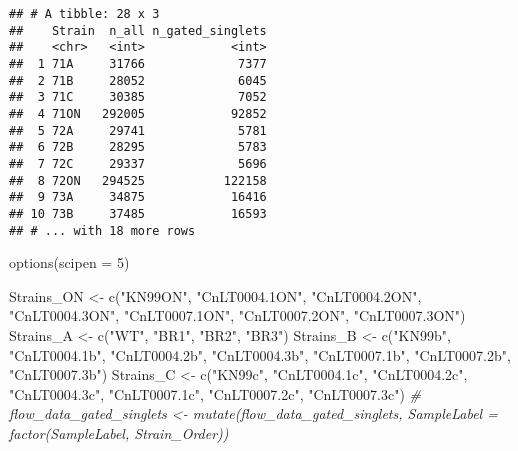 \documentclass[
]{article}
\newenvironment{Shaded}{\begin{snugshade}}{\end{snugshade}}
\newcommand{\AttributeTok}[1]{\textcolor[rgb]{0.77,0.63,0.00}{#1}}
\newcommand{\CommentTok}[1]{\textcolor[rgb]{0.56,0.35,0.01}{\textit{#1}}}
\newcommand{\DecValTok}[1]{\textcolor[rgb]{0.00,0.00,0.81}{#1}}
\newcommand{\FunctionTok}[1]{\textcolor[rgb]{0.00,0.00,0.00}{#1}}
\newcommand{\NormalTok}[1]{#1}
\newcommand{\OtherTok}[1]{\textcolor[rgb]{0.56,0.35,0.01}{#1}}
\newcommand{\StringTok}[1]{\textcolor[rgb]{0.31,0.60,0.02}{#1}}
\begin{document}
\begin{verbatim}
## # A tibble: 28 x 3
##    Strain  n_all n_gated_singlets
##    <chr>   <int>            <int>
##  1 71A     31766             7377
##  2 71B     28052             6045
##  3 71C     30385             7052
##  4 71ON   292005            92852
##  5 72A     29741             5781
##  6 72B     28295             5783
##  7 72C     29337             5696
##  8 72ON   294525           122158
##  9 73A     34875            16416
## 10 73B     37485            16593
## # ... with 18 more rows
\end{verbatim}

\begin{Shaded}
\begin{Highlighting}[]
\FunctionTok{options}\NormalTok{(}\AttributeTok{scipen =} \DecValTok{5}\NormalTok{)}

\NormalTok{Strains\_ON }\OtherTok{\textless{}{-}} \FunctionTok{c}\NormalTok{(}\StringTok{"KN99ON"}\NormalTok{, }\StringTok{"CnLT0004.1ON"}\NormalTok{, }\StringTok{"CnLT0004.2ON"}\NormalTok{, }\StringTok{"CnLT0004.3ON"}\NormalTok{, }\StringTok{"CnLT0007.1ON"}\NormalTok{, }\StringTok{"CnLT0007.2ON"}\NormalTok{, }\StringTok{"CnLT0007.3ON"}\NormalTok{)}
\NormalTok{Strains\_A }\OtherTok{\textless{}{-}} \FunctionTok{c}\NormalTok{(}\StringTok{"WT"}\NormalTok{, }\StringTok{"BR1"}\NormalTok{, }\StringTok{"BR2"}\NormalTok{, }\StringTok{"BR3"}\NormalTok{)}
\NormalTok{Strains\_B }\OtherTok{\textless{}{-}} \FunctionTok{c}\NormalTok{(}\StringTok{"KN99b"}\NormalTok{, }\StringTok{"CnLT0004.1b"}\NormalTok{, }\StringTok{"CnLT0004.2b"}\NormalTok{, }\StringTok{"CnLT0004.3b"}\NormalTok{, }\StringTok{"CnLT0007.1b"}\NormalTok{, }\StringTok{"CnLT0007.2b"}\NormalTok{, }\StringTok{"CnLT0007.3b"}\NormalTok{)}
\NormalTok{Strains\_C }\OtherTok{\textless{}{-}} \FunctionTok{c}\NormalTok{(}\StringTok{"KN99c"}\NormalTok{, }\StringTok{"CnLT0004.1c"}\NormalTok{, }\StringTok{"CnLT0004.2c"}\NormalTok{, }\StringTok{"CnLT0004.3c"}\NormalTok{, }\StringTok{"CnLT0007.1c"}\NormalTok{, }\StringTok{"CnLT0007.2c"}\NormalTok{, }\StringTok{"CnLT0007.3c"}\NormalTok{)}
\CommentTok{\# flow\_data\_gated\_singlets \textless{}{-} mutate(flow\_data\_gated\_singlets, SampleLabel = factor(SampleLabel, Strain\_Order))}



\end{Highlighting}
\end{Shaded}
\end{document}
